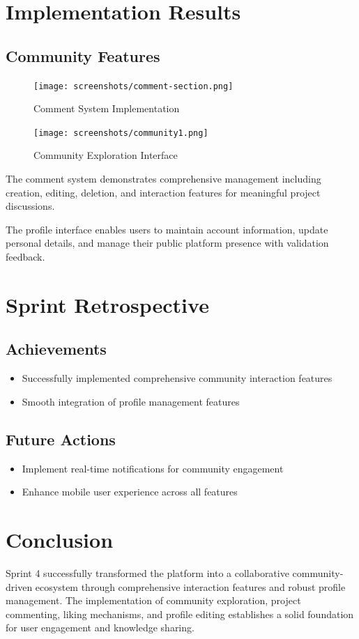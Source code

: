 \section{Implementation Results}

\subsection{Community Features}
\begin{figure}[H]
    \centering
    \texttt{[image: screenshots/comment-section.png]}
    \caption{Comment System Implementation}
    \label{fig:comment_section}
    \end{figure}

\begin{figure}[H]
\centering
\texttt{[image: screenshots/community1.png]}
\caption{Community Exploration Interface}
\label{fig:community_main}
\end{figure}




The comment system demonstrates comprehensive management including creation, editing, deletion, and interaction features for meaningful project discussions.



The profile interface enables users to maintain account information, update personal details, and manage their public platform presence with validation feedback.

\section{Sprint Retrospective}

\subsection{Achievements}
\begin{itemize}
\item Successfully implemented comprehensive community interaction features
\item Smooth integration of profile management features
\end{itemize}


\subsection{Future Actions}
\begin{itemize}
\item Implement real-time notifications for community engagement
\item Enhance mobile user experience across all features
\end{itemize}

\section{Conclusion}

Sprint 4 successfully transformed the platform into a collaborative community-driven ecosystem through comprehensive interaction features and robust profile management. The implementation of community exploration, project commenting, liking mechanisms, and profile editing establishes a solid foundation for user engagement and knowledge sharing.

